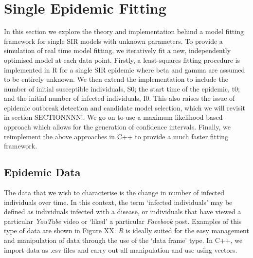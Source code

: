 \chapter{Single Epidemic Fitting}
\label{ch:single}

In this section we explore the theory and implementation behind a
model fitting framework for single SIR models with unknown
parameters. To provide a simulation of real time model fitting, we
iteratively fit a new, independently optimised model at each data point. Firstly, a
least-squares fitting procedure is implemented in R for a single SIR
epidemic where beta and gamma are assumed to be entirely
unknown. We then extend the implementation to include the number of
initial susceptible individuals, S0; the start time
of the epidemic, t0; and the initial number of infected individuals, I0. This also raises
the issue of epidemic outbreak detection and candidate model selection, which we
will revisit in section SECTIONNNN!. We go on to use a maximum
likelihood based approach which allows for the generation of
confidence intervals. Finally, we reimplement the above approaches in
C++ to provide a much faster fitting framework.

\section{Epidemic Data}
The data that we wish to characterise is the change in number of
infected individuals over time. In this context, the term `infected individuals' may be
defined as individuals infected with a disease, or individuals that
have viewed a particular \emph{YouTube} video or `liked' a particular
\emph{Facebook} post. Examples of this type of data are shown in
Figure XX. \emph{R} is ideally suited for the easy management and
manipulation of data through the use of the `data frame' type. In C++,
we import data as .csv files and carry out all manipulation and use
using vectors.


